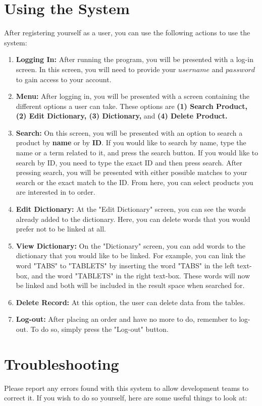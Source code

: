 \documentclass[a4paper,10pt]{article}
\begin{document}
\section{Using the System}
	After registering yourself as a user, you can use the following actions to use the system:
	\begin{enumerate}
	\item \textbf{Logging In:}
		After running the program, you will be presented with a log-in screen.  In this screen, you will need to provide your $username$ and $password$ to gain access to your account.
	\item \textbf{Menu:}
		After logging in, you will be presented with a screen containing the different options a user can take. These options are \textbf{(1) Search Product, (2) Edit Dictionary, (3) Dictionary,} and \textbf{ (4) Delete Product.}

	\item \textbf{Search:}
		On this screen, you will be presented with an option to search a product by \textbf{name} or by \textbf{ID}. If you would like to search by name, type the name or a term related to it, and press the search button. If you would like to search by ID, you need to type the exact ID and then press search.  After pressing search, you will be presented with either possible matches to your search or the exact match to the ID.  From here, you can select products you are interested in to order.
	\item \textbf{Edit Dictionary:}
		At the "Edit Dictionary" screen, you can see the words already added to the dictionary. Here, you can delete words that you would prefer not to be linked at all.
	\item \textbf{View Dictionary:}
		On the "Dictionary" screen, you can add words to the dictionary that you would like to be linked. For example, you can link the word "TABS" to "TABLETS" by inserting the word "TABS" in the left text-box, and the word "TABLETS" in the right text-box. These words will now be linked and both will be included in the result space when searched for. 
	\item \textbf{Delete Record:}
		At this option, the user can delete data from the tables. 
	\item \textbf{Log-out:}
		After placing an order and have no more to do, remember to log-out. To do so, simply press the "Log-out" button.\\
	\end{enumerate}
	
\section{Troubleshooting}
	Please report any errors found with this system to allow development teams to correct it. If you wish to do so yourself, here are some useful things to look at:
\end{document}
